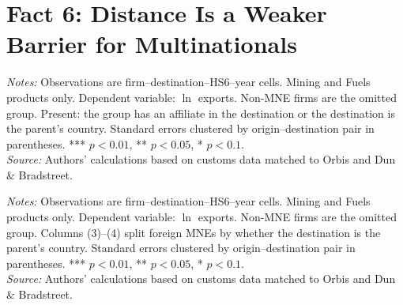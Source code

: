 \documentclass[11pt,a4paper]{article}
\begin{document}
\section{Fact 6: Distance Is a Weaker Barrier for Multinationals}\label{sec:f6_mining}
\begin{table}[H]\centering\small%
  \caption{Mining and Fuels: Distance and Firm Exports: Multinationals by Presence at the Destination}%
  \label{tab:t2_mining}%
  \par\vspace{3pt}%
  \begin{minipage}{0.95\textwidth}\footnotesize %
  \textit{Notes:} Observations are firm--destination--HS6--year cells. Mining and Fuels products only. Dependent variable: $\ln$ exports. Non-MNE firms are the omitted group. Present: the group has an affiliate in the destination or the destination is the parent's country. Standard errors clustered by origin--destination pair in parentheses. *** $p<0.01$, ** $p<0.05$, * $p<0.1$.\\[3pt]%
  \textit{Source:} Authors' calculations based on customs data matched to Orbis and Dun \& Bradstreet.%
  \end{minipage}%
  \end{table}
\begin{table}[H]\centering\small%
  \caption{Mining and Fuels: Distance and Firm Exports: Foreign and Domestic Multinationals}%
  \label{tab:dist_mining}%
  \par\vspace{3pt}%
  \begin{minipage}{0.95\textwidth}\footnotesize %
  \textit{Notes:} Observations are firm--destination--HS6--year cells. Mining and Fuels products only. Dependent variable: $\ln$ exports. Non-MNE firms are the omitted group. Columns (3)--(4) split foreign MNEs by whether the destination is the parent's country. Standard errors clustered by origin--destination pair in parentheses. *** $p<0.01$, ** $p<0.05$, * $p<0.1$.\\[3pt]%
  \textit{Source:} Authors' calculations based on customs data matched to Orbis and Dun \& Bradstreet.%
  \end{minipage}%
  \end{table}
\end{document}
